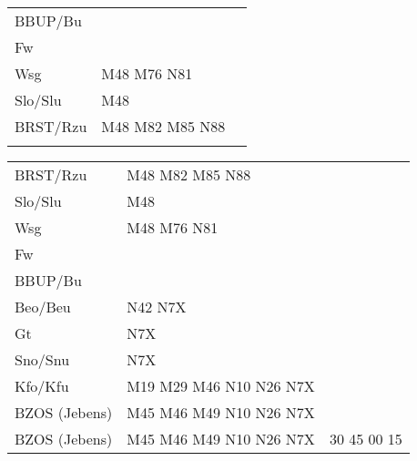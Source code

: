 \begin{tabular}{!{\color{schiefergrau}\vrule width 3pt}*{3}{l!{\color{schiefergrau}\vrule width 3pt}}}
BBUP/Bu      &                                                                       & \\
Fw           &                                                                       & \\
Wsg          & \mbus{} M48 M76 \nbus{} N81                                           & \\
Slo/Slu      & \mbus{} M48                                                           & \\
BRST/Rzu     & \mbus{} M48 M82 M85 \nbus{} N88                                       & \\
\myhline
\end{tabular}
%
\begin{tabular}{!{\color{schiefergrau}\vrule width 3pt}*{3}{l!{\color{schiefergrau}\vrule width 3pt}}}
\hline
{}
 \\
\hline
BRST/Rzu     & \mbus{} M48 M82 M85 \nbus{} N88                                       & \\
Slo/Slu      & \mbus{} M48                                                           & \\
Wsg          & \mbus{} M48 M76 \nbus{} N81                                           & \\
Fw           &                                                                       & \\
BBUP/Bu      &                                                                       & \\
Beo/Beu      & \nusieben{} \nbus{} N42 N7X                                           & \\
Gt           & N7X                                                                   & \\
Sno/Snu      & \nudrei{} N7X                                                         & \\
Kfo/Kfu      & \nueins{} \nuzwei{} \nudrei{} \mbus{} M19 M29 M46 \nbus{} N10 N26 N7X & \\
BZOS (Jebens)& \nueins{} \nuzwei{} \mbus{} M45 M46 M49 \nbus{} N10 N26 N7X           & \\
\hline
BZOS (Jebens)& \nueins{} \nuzwei{} \mbus{} M45 M46 M49 \nbus{} N10 N26 N7X           & 30 45 00 15 \\

\end{tabular}
